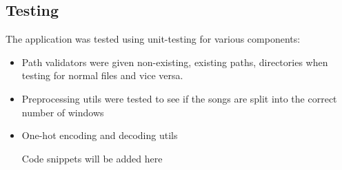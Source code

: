\newpage
\subsection{Testing}

The application was tested using unit-testing for various components:
\begin{itemize}
	\item Path validators were given non-existing, existing paths, directories when testing for normal files and vice versa.
	\item Preprocessing utils were tested to see if the songs are split into the correct number of windows
	\item One-hot encoding and decoding utils
	
	Code snippets will be added here
\end{itemize}